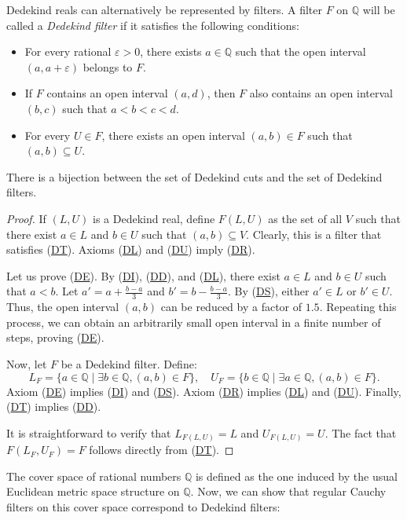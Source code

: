 \documentclass[pdflatex,sn-mathphys-num]{sn-jnl}
\newcommand{\axitem}[1]{\phantomsection \label{ax:#1}}
\newcommand{\axref}[1]{(\hyperref[ax:#1]{#1})}
\theoremstyle{definition}
\theoremstyle{remark}
\numberwithin{figure}{section}
\begin{document}
Dedekind reals can alternatively be represented by filters.
A filter $F$ on $\mathbb{Q}$ will be called a \emph{Dedekind filter} if it satisfies the following conditions:
\begin{itemize}[(DE)]
\item[(DE)] \axitem{DE} For every rational $\varepsilon > 0$, there exists $a \in \mathbb{Q}$ such that the open interval $(a, a + \varepsilon)$ belongs to $F$.
\item[(DR)] \axitem{DR} If $F$ contains an open interval $(a,d)$, then $F$ also contains an open interval $(b,c)$ such that $a < b < c < d$.
\item[(DT)] \axitem{DT} For every $U \in F$, there exists an open interval $(a,b) \in F$ such that $(a,b) \subseteq U$.
\end{itemize}

\begin{prop}
There is a bijection between the set of Dedekind cuts and the set of Dedekind filters.
\end{prop}
\begin{proof}
If $(L,U)$ is a Dedekind real, define $F(L,U)$ as the set of all $V$ such that there exist $a \in L$ and $b \in U$ such that $(a,b) \subseteq V$.
Clearly, this is a filter that satisfies \axref{DT}.
Axioms \axref{DL} and \axref{DU} imply \axref{DR}.

Let us prove \axref{DE}.
By \axref{DI}, \axref{DD}, and \axref{DL}, there exist $a \in L$ and $b \in U$ such that $a < b$.
Let $a' = a + \frac{b - a}{3}$ and $b' = b - \frac{b - a}{3}$.
By \axref{DS}, either $a' \in L$ or $b' \in U$.
Thus, the open interval $(a,b)$ can be reduced by a factor of $1.5$.
Repeating this process, we can obtain an arbitrarily small open interval in a finite number of steps, proving \axref{DE}.

Now, let $F$ be a Dedekind filter.
Define:
\[ L_F = \{ a \in \mathbb{Q} \mid \exists b \in \mathbb{Q}, (a,b) \in F \}, \quad U_F = \{ b \in \mathbb{Q} \mid \exists a \in \mathbb{Q}, (a,b) \in F \}. \]
Axiom \axref{DE} implies \axref{DI} and \axref{DS}.
Axiom \axref{DR} implies \axref{DL} and \axref{DU}.
Finally, \axref{DT} implies \axref{DD}.

It is straightforward to verify that $L_{F(L,U)} = L$ and $U_{F(L,U)} = U$.
The fact that $F(L_F,U_F) = F$ follows directly from \axref{DT}.
\end{proof}

The cover space of rational numbers $\mathbb{Q}$ is defined as the one induced by the usual Euclidean metric space structure on $\mathbb{Q}$.
Now, we can show that regular Cauchy filters on this cover space correspond to Dedekind filters:
\end{document}
